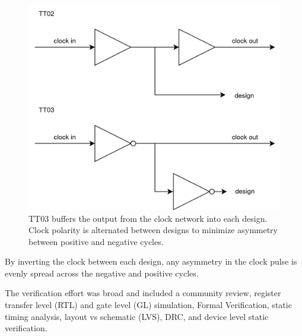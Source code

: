 \begin{figure}[htp]
\centering
\includegraphics[width=\columnwidth]{./Figs/tt02 vs tt03 scanchain clock.png}
\caption{TT03 buffers the output from the clock network into each design. Clock polarity is alternated between designs to minimize asymmetry between positive and negative cycles.}
\label{fig:TT02_vs_TT03}
\end{figure}

By inverting the clock between each design, any asymmetry in the clock pulse is evenly spread across the negative and positive cycles.

The verification effort\cite{verificationmd} was broad and included a community review, register transfer level (RTL) and gate level (GL) simulation, Formal Verification\cite{sby}, static timing analysis, layout vs schematic (LVS), DRC, and device level static verification\cite{cvc}.

